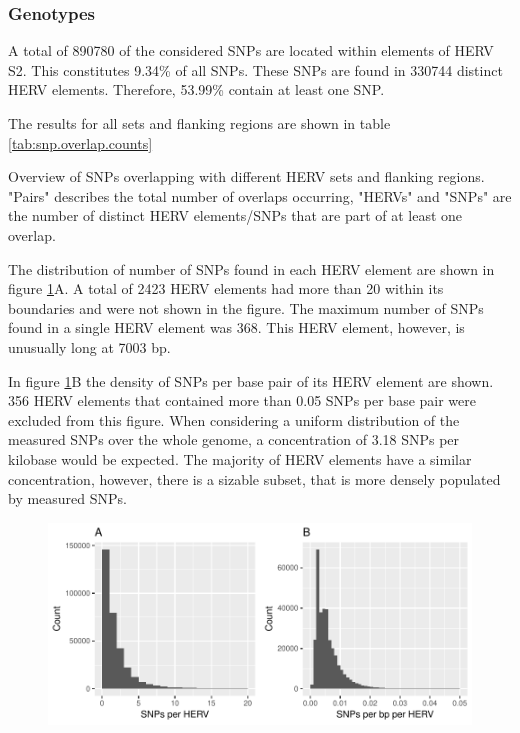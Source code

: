 \documentclass[a4paper,12pt,twoside,openright]{article}
\begin{document}
\subsubsection{Genotypes}
A total of 890780 of the considered SNPs are located within elements of HERV S2. This constitutes 9.34\% of all SNPs. These SNPs are found in 330744 distinct HERV elements. Therefore, 53.99\% contain at least one SNP.

The results for all sets and flanking regions are shown in table \ref{tab:snp.overlap.counts}

\begin{table}[h!]
  \begin{center}
  \end{center}        
	\caption{Overview of SNPs overlapping with different HERV sets and flanking regions. "Pairs" describes the total number of overlaps occurring, "HERVs" and "SNPs" are the number of distinct HERV elements/SNPs that are part of at least one overlap.}
	\label{tab:snp.overlap.counts}
\end{table} 

The distribution of number of SNPs found in each HERV element are shown in figure \ref{fig:hervS2.snp.hist}A. A total of 2423 HERV elements had more than 20 within its boundaries and were not shown in the figure. The maximum number of SNPs found in a single HERV element was 368. This HERV element, however, is unusually long at 7003 bp. 

In figure \ref{fig:hervS2.snp.hist}B the density of SNPs per base pair of its HERV element are shown. 356 HERV elements that contained more than 0.05 SNPs per base pair were excluded from this figure. When considering a uniform distribution of the measured SNPs over the whole genome, a concentration of 3.18 SNPs per kilobase would be expected. The majority of HERV elements have a similar concentration, however, there is a sizable subset, that is more densely populated by measured SNPs. 

\begin{figure}[tb]
	\includegraphics[scale = 1, keepaspectratio = true]{../figures/hervS2_snp_hist}  
	\caption{}
    \label{fig:hervS2.snp.hist}
\end{figure}
\end{document}
